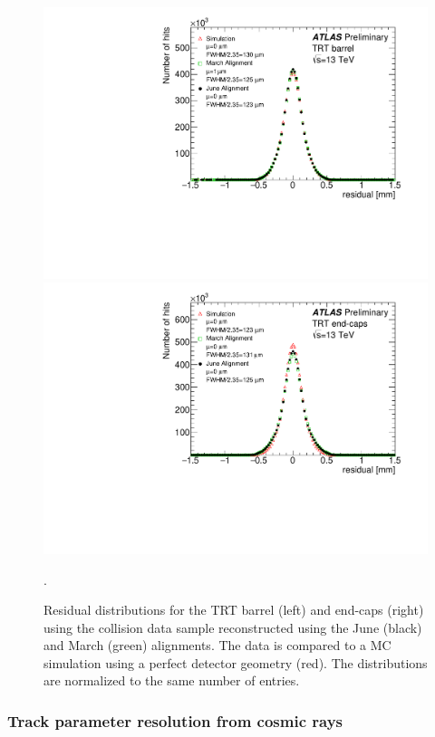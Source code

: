 \begin{figure}[htbp]
  \includegraphics[width=.48\textwidth]{figs/alignment/align2015/TRTR}
  \includegraphics[width=.48\textwidth]{figs/alignment/align2015/TRTEC}
  \caption{Residual distributions for the TRT barrel (left) and end-caps (right) using the  collision data sample reconstructed using the June (black) and March (green) alignments.  The data is compared to a MC simulation using a perfect detector geometry (red).  The distributions are normalized to the same number of entries.}
  \label{fig:align_2015_results_trt}.
\end{figure}

\subsubsection{Track parameter resolution from cosmic rays}\label{align:2015_results_cosmic}

